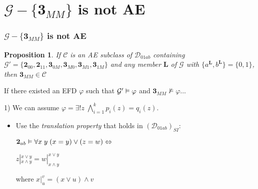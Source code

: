 \documentclass[12pt,handout]{beamer}
\newenvironment{stepitemize}{\begin{itemize}[<+->]}{\end{itemize} }
\newtheorem{propo}{Proposition}
\begin{document}
\section{$\mathcal{G} - \{\mathbf{3}_{MM}\}$ is not AE}

\begin{frame}

\frametitle{$\mathcal{G} - \{\mathbf{3}_{MM}\}$ is not AE}
 
\begin{propo}
 If $\mathcal{C}$ is an AE subclass of $\mathcal{D}_{01ab}$ containing $\mathcal{G}' = \{\mathbf{2}_{00}, \mathbf{2}_{11}, 
\mathbf{3}_{0M}, \mathbf{3}_{M0}, \mathbf{3}_{M1}, \mathbf{3}_{1M}\}$ and any member $\mathbf{L}$ of $\mathcal{G}$ with 
$\{a^{\mathbf{L}},b^{\mathbf{L}}\} = \{0,1\}$, 
then $\mathbf{3}_{MM} \in \mathcal{C}$
\end{propo}

\end{frame}


\begin{frame}

\bigskip

If there existed an EFD $\varphi$ such that $\mathcal{G}' \vDash \varphi$ and $\mathbf{3}_{MM} \nvDash \varphi$...

\pause

\bigskip

1) We can assume $\varphi = \exists ! z \; \bigwedge_{i=1}^{k}p_{i}(z) = q_{i}(z)$. 


\begin{stepitemize}

\item Use the \textit{translation property} that holds in $(\mathcal{D}_{01ab})_{SI}$:

\pause

$\mathbf{2}_{ab} \vDash \forall x \; y \; (x = y) \vee (z = w) \Leftrightarrow$

$z|_{x \wedge y}^{x \vee y} =  w|_{x \wedge y}^{x \vee y}$

\pause
\bigskip

where $x|_u^v = (x  \vee u) \wedge v$




\end{stepitemize}

\end{frame}
\end{document}
